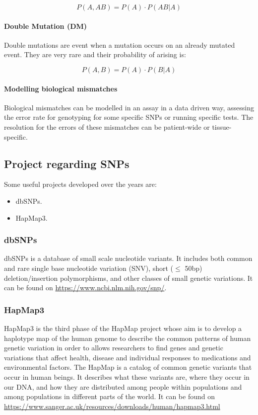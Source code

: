 			$$P(A,AB) = P(A) \cdot P(AB | A)$$

			\paragraph{Double Mutation (DM)}
			Double mutations are event when a mutation occurs on an already mutated event.
			They are very rare and their probability of arising is:

			$$P(A,B) = P(A) \cdot P(B | A)$$

			\paragraph{Modelling biological mismatches}
			Biological mismatches can be modelled in an assay in a data driven way, assessing the error rate for genotyping for some specific SNPs or running specific tests.
			The resolution for the errors of these mismatches can be patient-wide or tissue-specific.


	\subsection{Project regarding SNPs}
	Some useful projects developed over the years are:

	\begin{multicols}{2}
		\begin{itemize}
			\item dbSNPs.
			\item HapMap3.
		\end{itemize}
	\end{multicols}

		\subsubsection{dbSNPs}
		dbSNPs is a database of small scale nucleotide variants.
		It includes both common and rare single base nucleotide variation (SNV), short ($\leq$ 50bp) deletion/insertion polymorphisms, and other classes of small genetic variations.
		It can be found on \url{https://www.ncbi.nlm.nih.gov/snp/}.

		\subsubsection{HapMap3}
		HapMap3 is the third phase of the HapMap project whose aim is to develop a haplotype map of the human genome to describe the common patterns of human genetic variation in order to allows researchers to find genes and genetic variations that affect health, disease and individual responses to medications and environmental factors.
		The HapMap is a catalog of common genetic variants that occur in human beings.
		It describes what these variants are, where they occur in our DNA, and how they are distributed among people within populations and among populations in different parts of the world.
		It can be found on \url{https://www.sanger.ac.uk/resources/downloads/human/hapmap3.html}

